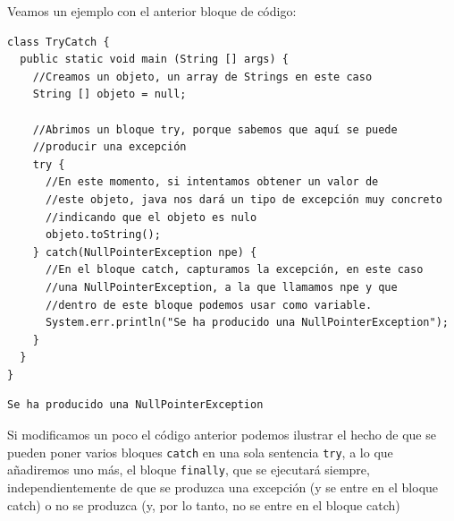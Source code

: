 \documentclass[11pt]{article}
\begin{document}
Veamos un ejemplo con el anterior bloque de código:

\begin{verbatim}
class TryCatch {
  public static void main (String [] args) {
    //Creamos un objeto, un array de Strings en este caso
    String [] objeto = null;

    //Abrimos un bloque try, porque sabemos que aquí se puede
    //producir una excepción
    try {
      //En este momento, si intentamos obtener un valor de
      //este objeto, java nos dará un tipo de excepción muy concreto
      //indicando que el objeto es nulo
      objeto.toString();
    } catch(NullPointerException npe) {
      //En el bloque catch, capturamos la excepción, en este caso
      //una NullPointerException, a la que llamamos npe y que
      //dentro de este bloque podemos usar como variable.
      System.err.println("Se ha producido una NullPointerException");
    }
  }
}
\end{verbatim}

\begin{verbatim}
Se ha producido una NullPointerException
\end{verbatim}

Si modificamos un poco el código anterior podemos ilustrar el hecho de que se pueden poner varios bloques \texttt{catch} en una sola sentencia \texttt{try}, a lo que añadiremos uno más, el bloque \texttt{finally}, que se ejecutará siempre, independientemente de que se produzca una excepción (y se entre en el bloque catch) o no se produzca (y, por lo tanto, no se entre en el bloque catch)
\end{document}
